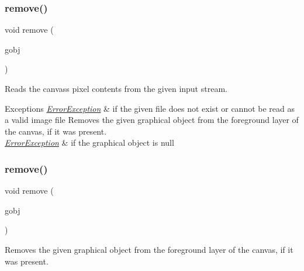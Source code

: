 \subsubsection{\texorpdfstring{remove()}{remove()}\hspace{0.1cm}{\footnotesize\ttfamily [1/2]}}
{\footnotesize\ttfamily void remove (\begin{DoxyParamCaption}\item[{\mbox{\hyperlink{classGObject}{G\+Object}} $\ast$}]{gobj }\end{DoxyParamCaption})\hspace{0.3cm}{\ttfamily [virtual]}}



Reads the canvas\textquotesingle{}s pixel contents from the given input stream. 


\begin{DoxyExceptions}{Exceptions}
{\em \mbox{\hyperlink{classErrorException}{Error\+Exception}}} & if the given file does not exist or cannot be read as a valid image file Removes the given graphical object from the foreground layer of the canvas, if it was present. \\
\hline
{\em \mbox{\hyperlink{classErrorException}{Error\+Exception}}} & if the graphical object is null \\
\hline
\end{DoxyExceptions}
\mbox{\label{classGCanvas_a0c0ae4d69b584602ff3cba0d9cf330a4}} 
\subsubsection{\texorpdfstring{remove()}{remove()}\hspace{0.1cm}{\footnotesize\ttfamily [2/2]}}
{\footnotesize\ttfamily void remove (\begin{DoxyParamCaption}\item[{\mbox{\hyperlink{classGObject}{G\+Object}} \&}]{gobj }\end{DoxyParamCaption})\hspace{0.3cm}{\ttfamily [virtual]}}



Removes the given graphical object from the foreground layer of the canvas, if it was present. 

\mbox{\label{classGCanvas_a9b0a5a3ad9972ab0e8eb0b54873aac6b}} 
